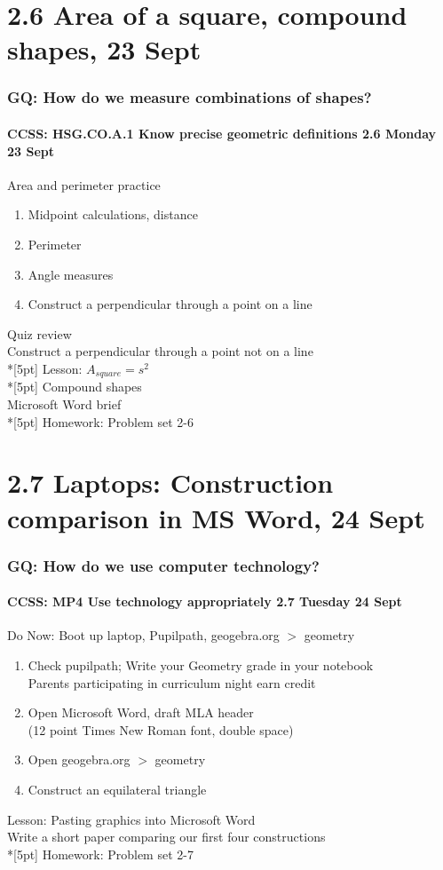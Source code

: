 \documentclass{beamer}
\begin{document}
    \section{2.6 Area of a square, compound shapes, 23 Sept}
    \frame
    {
      \frametitle{GQ: How do we measure combinations of shapes?}
      \framesubtitle{CCSS: HSG.CO.A.1 Know precise geometric definitions \hfill \alert{2.6 Monday 23 Sept}}
  
      \begin{block}{Area and perimeter practice}
      \begin{enumerate}
        \item Midpoint calculations, distance
        \item Perimeter
        \item Angle measures
        \item Construct a perpendicular through a point on a line
      \end{enumerate}
      \end{block}
      Quiz review \\
      Construct a perpendicular through a point not on a line \\*[5pt]
      Lesson: $\displaystyle A_{square}=s^2$ \\*[5pt]
      Compound shapes \\
      Microsoft Word brief \\*[5pt]
      Homework: Problem set 2-6
    }

    \section{2.7 Laptops: Construction comparison in MS Word, 24 Sept}
    \frame
    {
      \frametitle{GQ: How do we use computer technology?}
      \framesubtitle{CCSS: MP4 Use technology appropriately \hfill \alert{2.7 Tuesday 24 Sept}}
    
      \begin{block}{Do Now: Boot up laptop, Pupilpath, geogebra.org $>$ geometry}
      \begin{enumerate}
          \item Check pupilpath; Write your Geometry grade in your notebook \\
          \alert{Parents participating in curriculum night earn credit}
          \item Open Microsoft Word, draft MLA header \\
          (12 point Times New Roman font, double space)
          \item Open geogebra.org $>$ geometry
          \item Construct an equilateral triangle
      \end{enumerate}
      \end{block}
      Lesson: Pasting graphics into Microsoft Word \\
      Write a short paper comparing our first four constructions \\*[5pt]
      Homework: Problem set 2-7
    }
\end{document}
